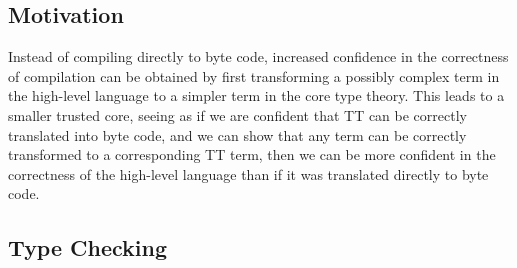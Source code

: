 \subsection{Motivation}
Instead of compiling \IdrisM{} directly to byte code, increased confidence in
the correctness of compilation can be obtained by first transforming a possibly
complex term in the high-level language to a simpler term in the core type
theory. This leads to a smaller trusted core, seeing as if we are
confident that TT can be correctly translated into byte code, and we can
show that any \IdrisM{} term can be correctly transformed
to a corresponding TT term, then we can be more confident in the correctness of
the high-level \IdrisM{} language than if it was translated directly to byte
code.

\subsection{Type Checking}
\label{sec:type-checking}




